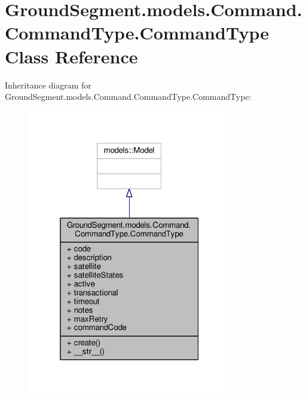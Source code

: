 \hypertarget{class_ground_segment_1_1models_1_1_command_1_1_command_type_1_1_command_type}{}\section{Ground\+Segment.\+models.\+Command.\+Command\+Type.\+Command\+Type Class Reference}
\label{class_ground_segment_1_1models_1_1_command_1_1_command_type_1_1_command_type}


Inheritance diagram for Ground\+Segment.\+models.\+Command.\+Command\+Type.\+Command\+Type\+:\nopagebreak
\begin{figure}[H]
\begin{center}
\leavevmode
\includegraphics[width=253pt]{class_ground_segment_1_1models_1_1_command_1_1_command_type_1_1_command_type__inherit__graph}
\end{center}
\end{figure}


